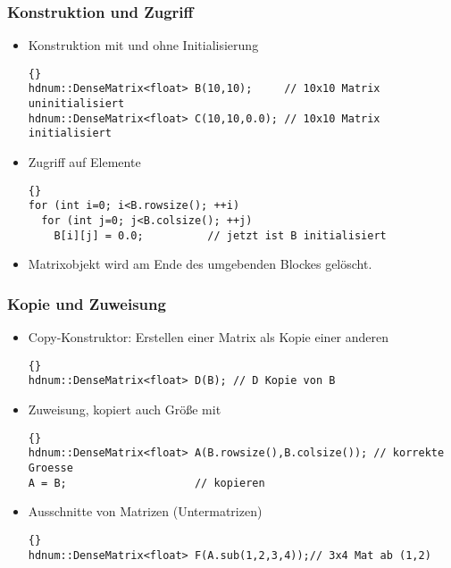 \documentclass[a4paper,11pt]{article}
\theoremstyle{definition}
\begin{document}
\begin{frame}[fragile]
\frametitle{Konstruktion und Zugriff}
\begin{itemize}
\item Konstruktion mit und ohne Initialisierung\\
{\footnotesize{\begin{lstlisting}{}
hdnum::DenseMatrix<float> B(10,10);     // 10x10 Matrix uninitialisiert
hdnum::DenseMatrix<float> C(10,10,0.0); // 10x10 Matrix initialisiert
\end{lstlisting}}}
\item Zugriff auf Elemente\\
{\footnotesize{\begin{lstlisting}{}
for (int i=0; i<B.rowsize(); ++i)
  for (int j=0; j<B.colsize(); ++j)
    B[i][j] = 0.0;          // jetzt ist B initialisiert
\end{lstlisting}}}
\item Matrixobjekt wird am Ende des umgebenden Blockes gelöscht.
\end{itemize}
\end{frame}

\begin{frame}[fragile]
\frametitle{Kopie und Zuweisung}
\begin{itemize}
\item Copy-Konstruktor: Erstellen einer Matrix als Kopie einer anderen
{\footnotesize{\begin{lstlisting}{}
hdnum::DenseMatrix<float> D(B); // D Kopie von B
\end{lstlisting}}}
\item Zuweisung, kopiert auch Größe mit
{\footnotesize{\begin{lstlisting}{}
hdnum::DenseMatrix<float> A(B.rowsize(),B.colsize()); // korrekte Groesse
A = B;                    // kopieren
\end{lstlisting}}}
\item Ausschnitte von Matrizen (Untermatrizen)\\
{\footnotesize{\begin{lstlisting}{}
hdnum::DenseMatrix<float> F(A.sub(1,2,3,4));// 3x4 Mat ab (1,2)
\end{lstlisting}}}
\end{itemize}
\end{frame}
\end{document}
